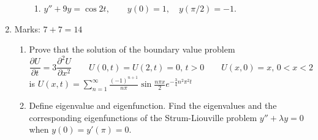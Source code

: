 \documentclass[../main-sheet.tex]{subfiles}
\begin{document}
\begin{enumerate}
\begin{enumerate}
\begin{enumerate}
            \item $ y''+9y=\cos 2t,\qquad y(0)=1,\quad y(\pi/2)=-1 $.
        \end{enumerate}
    \end{enumerate}
    \item Marks: $ 7+7=14 $
    \begin{enumerate}
        \item Prove that the solution of the boundary value problem
        \[
            \frac{\partial U}{\partial t}=3\frac{\partial^2 U}{\partial x^2}\qquad U(0,t)=U(2,t)=0,\,t>0\qquad U(x,0)=x,\,0<x<2
        \]
        is $ \displaystyle U(x,t)=\sum_{n=1}^\infty \frac{(-1)^{n+1}}{n\pi}\sin\frac{n\pi x}{2}e^{-\frac{3}{4}n^2\pi^2t} $
        \item Define eigenvalue and eigenfunction. Find the eigenvalues and the corresponding eigenfunctions of the Strum-Liouville problem $ y''+\lambda y=0 $ when $ y(0)=y'(\pi)=0 $.
    \end{enumerate}
\end{enumerate}
\newpage
\end{document}
